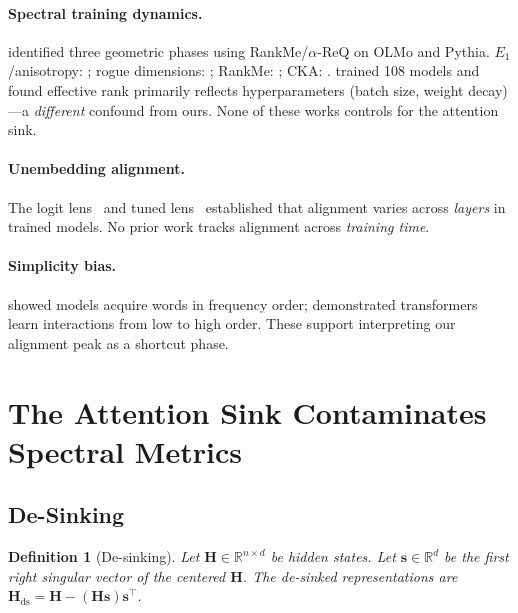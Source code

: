 \documentclass[11pt]{article}
\newtheorem{definition}[theorem]{Definition}
\begin{document}
\paragraph{Spectral training dynamics.}
\citet{li2025tracing} identified three geometric phases using RankMe/$\alpha$-ReQ on OLMo and Pythia.
$E_1$/anisotropy: \citet{ethayarajh2019contextual}; rogue dimensions: \citet{timkey2021all}; RankMe: \citet{garrido2023rankme}; CKA: \citet{kornblith2019similarity}.
\citet{kulkarni2026disentangling} trained 108 models and found effective rank primarily reflects hyperparameters (batch size, weight decay)---a \emph{different} confound from ours.
None of these works controls for the attention sink.

\paragraph{Unembedding alignment.}
The logit lens~\citep{nostalgebraist2020logit} and tuned lens~\citep{belrose2023eliciting} established that alignment varies across \emph{layers} in trained models.
No prior work tracks alignment across \emph{training time}.

\paragraph{Simplicity bias.}
\citet{chang2022word} showed models acquire words in frequency order; \citet{cagnetta2024distributional} demonstrated transformers learn interactions from low to high order.
These support interpreting our alignment peak as a shortcut phase.

\section{The Attention Sink Contaminates Spectral Metrics}\label{sec:theory}

\subsection{De-Sinking}\label{sec:desink}

\begin{definition}[De-sinking]
Let $\mathbf{H} \in \mathbb{R}^{n \times d}$ be hidden states.
Let $\mathbf{s} \in \mathbb{R}^d$ be the first right singular vector of the centered $\mathbf{H}$.
The de-sinked representations are $\mathbf{H}_{\text{ds}} = \mathbf{H} - (\mathbf{H}\mathbf{s})\mathbf{s}^\top$.
\end{definition}
\end{document}
